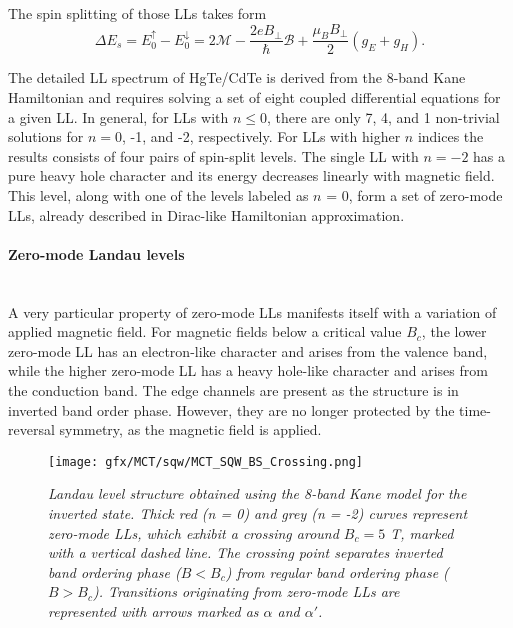 \documentclass[titlepage,a4paper]{book}
\newcommand{\wciecie}{\quad\phantom{v}}
\newcommand{\myparagraph}[1]{\paragraph{#1}\mbox{}\\}
\begin{document}
The spin splitting of those LLs takes form
\begin{equation}
\label{eq:MCT_SQW_ZeroMode_SpinSplitting}
\Delta E_s = E^{\uparrow}_0 - E^{\downarrow}_0 = 2\mathcal{M} -\frac{2eB_{\perp}}{\hbar}\mathcal{B}+\frac{\mu_B B_{\perp}}{2}(g_E + g_H). 
\end{equation}

The detailed LL spectrum of HgTe/CdTe is derived from the 8-band Kane Hamiltonian and requires solving a set of eight coupled differential equations for a given LL. In general, for LLs with $n \leq 0$, there are only 7, 4, and 1 non-trivial solutions for $n = 0$, -1, and -2, respectively. For LLs with higher $n$ indices the results consists of four pairs of spin-split levels. The single LL with $n = -2$ has a pure heavy hole character and its energy decreases linearly with magnetic field. This level, along with one of the levels labeled as $n$ = 0, form a set of zero-mode LLs, already described in Dirac-like Hamiltonian approximation.

\myparagraph{Zero-mode Landau levels}
\wciecie
A very particular property of zero-mode LLs manifests itself with a variation of applied magnetic field. For magnetic fields below a critical value $B_c$, the lower zero-mode LL has an electron-like character and arises from the valence band, while the higher zero-mode LL has a heavy hole-like character and arises from the conduction band. The edge channels are present as the structure is in inverted band order phase. However, they are no longer protected by the time-reversal symmetry, as the magnetic field is applied. 

\begin{figure}[ht]
	\centering
	\texttt{[image: gfx/MCT/sqw/MCT\_SQW\_BS\_Crossing.png]}
	\vspace{-10pt}
	\caption{\textit{Landau level structure obtained using the 8-band Kane model for the inverted state. Thick red (n = 0) and grey (n = -2) curves represent zero-mode LLs, which exhibit a crossing around $B_c = 5$ T, marked with a vertical dashed line. The crossing point separates inverted band ordering phase ($B < B_c$) from regular band ordering phase ($B > B_c$). Transitions originating from zero-mode LLs are represented with arrows marked as $\alpha$ and $\alpha'$.}}
	\label{fig:MCT_SQW_BS_Crossing}
\end{figure} 
\end{document}
